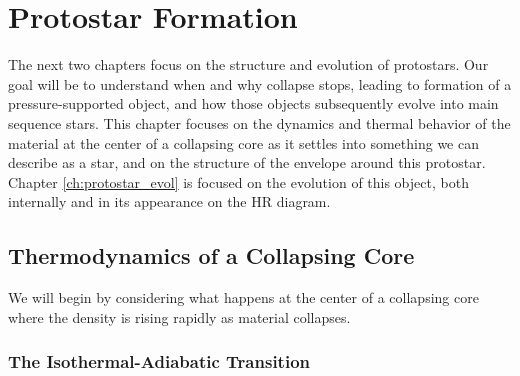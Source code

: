 \chapter{Protostar Formation}
\label{ch:protostar_form}


The next two chapters focus on the structure and evolution of protostars. Our goal will be to understand when and why collapse stops, leading to formation of a pressure-supported object, and how those objects subsequently evolve into main sequence stars. This chapter focuses on the dynamics and thermal behavior of the material at the center of a collapsing core as it settles into something we can describe as a star, and on the structure of the envelope around this protostar. Chapter \ref{ch:protostar_evol} is focused on the evolution of this object, both internally and in its appearance on the HR diagram. 

\section{Thermodynamics of a Collapsing Core}

We will begin by considering what happens at the center of a collapsing core where the density is rising rapidly as material collapses. 

\subsection{The Isothermal-Adiabatic Transition}
\label{ssec:iso_adiabat}


